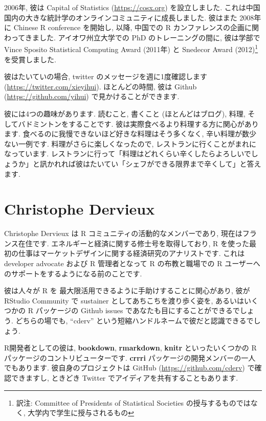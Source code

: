 \documentclass[
  11pt,
]{bxjsreport}
\begin{document}
2006年, 彼は Capital of Statistics (\url{https://cosx.org}) を設立しました. これは中国国内の大きな統計学のオンラインコミュニティに成長しました. 彼はまた 2008年に Chinese R conference を開始し, 以降, 中国での R カンファレンスの企画に関わってきました. アイオワ州立大学での PhD のトレーニングの間に, 彼は学部で Vince Sposito Statistical Computing Award (2011年) と Snedecor Award (2012)\footnote{訳注: Committee of Presidents of Statistical Societies の授与するものではなく, 大学内で学生に授与されるもの}を受賞しました.

彼はたいていの場合, twitter のメッセージを週に1度確認します (\url{https://twitter.com/xieyihui}). ほとんどの時間, 彼は Github (\url{https://github.com/yihui}) で見かけることができます.

彼には4つの趣味があります. 読むこと, 書くこと (ほとんどはブログ), 料理, そしてバドミントンをすることです. 彼は実際食べるより料理する方に関心があります. 食べるのに我慢できないほど好きな料理はそう多くなく, 辛い料理が数少ない一例です. 料理がさらに楽しくなったので, レストランに行くことがまれになっています. レストランに行って「料理はどれくらい辛くしたらよろしいでしょうか」と訊かれれば彼はたいてい「シェフができる限界まで辛くして」と答えます.

\hypertarget{christophe-dervieux}{%
\section*{Christophe Dervieux}\label{christophe-dervieux}}

Christophe Dervieux は R コミュニティの活動的なメンバーであり, 現在はフランス在住です. エネルギーと経済に関する修士号を取得しており, R を使った最初の仕事はマーケットデザインに関する経済研究のアナリストです. これは developer advocate および R 管理者となって R の布教と職場での R ユーザーへのサポートをするようになる前のことです.

彼は人々が R を 最大限活用できるように手助けすることに関心があり, 彼が RStudio Community で sustainer としてあちこちを渡り歩く姿を, あるいはいくつかの R パッケージの Github issues であなたも目にすることができるでしょう. どちらの場でも, ``cderv'' という短縮ハンドルネームで彼だと認識できるでしょう.

R開発者としての彼は, \textbf{bookdown}, \textbf{rmarkdown}, \textbf{knitr} といったいくつかの R パッケージのコントリビューターです. \textbf{crrri} パッケージの開発メンバーの一人でもあります. 彼自身のプロジェクトは GitHub (\url{https://github.com/cderv}) で確認できますし, ときどき Twitter でアイディアを共有することもあります.
\end{document}
